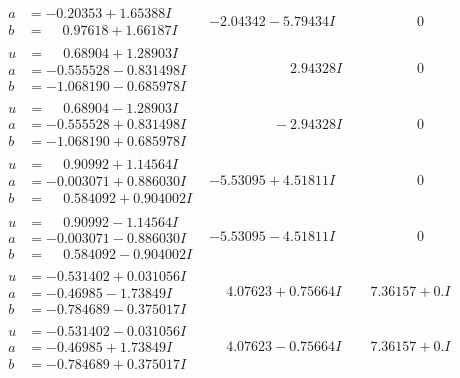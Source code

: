 \documentclass[1p]{elsarticle_modified}
\theoremstyle{definition}
\begin{document}
$$\begin{array}{c|c|c}
\begin{aligned}
a &= -0.20353 + 1.65388 I \\
b &= \phantom{-}0.97618 + 1.66187 I\end{aligned}
 & -2.04342 - 5.79434 I & \phantom{-0.000000 } 0 \\ \hline\begin{aligned}
u &= \phantom{-}0.68904 + 1.28903 I \\
a &= -0.555528 - 0.831498 I \\
b &= -1.068190 - 0.685978 I\end{aligned}
 & \phantom{-0.000000 -}2.94328 I & \phantom{-0.000000 } 0 \\ \hline\begin{aligned}
u &= \phantom{-}0.68904 - 1.28903 I \\
a &= -0.555528 + 0.831498 I \\
b &= -1.068190 + 0.685978 I\end{aligned}
 & \phantom{-0.000000 } -2.94328 I & \phantom{-0.000000 } 0 \\ \hline\begin{aligned}
u &= \phantom{-}0.90992 + 1.14564 I \\
a &= -0.003071 + 0.886030 I \\
b &= \phantom{-}0.584092 + 0.904002 I\end{aligned}
 & -5.53095 + 4.51811 I & \phantom{-0.000000 } 0 \\ \hline\begin{aligned}
u &= \phantom{-}0.90992 - 1.14564 I \\
a &= -0.003071 - 0.886030 I \\
b &= \phantom{-}0.584092 - 0.904002 I\end{aligned}
 & -5.53095 - 4.51811 I & \phantom{-0.000000 } 0 \\ \hline\begin{aligned}
u &= -0.531402 + 0.031056 I \\
a &= -0.46985 - 1.73849 I \\
b &= -0.784689 - 0.375017 I\end{aligned}
 & \phantom{-}4.07623 + 0.75664 I & \phantom{-}7.36157 + 0. I\phantom{ +0.000000I} \\ \hline\begin{aligned}
u &= -0.531402 - 0.031056 I \\
a &= -0.46985 + 1.73849 I \\
b &= -0.784689 + 0.375017 I\end{aligned}
 & \phantom{-}4.07623 - 0.75664 I & \phantom{-}7.36157 + 0. I\phantom{ +0.000000I}\\

\end{array}$$
\end{document}
